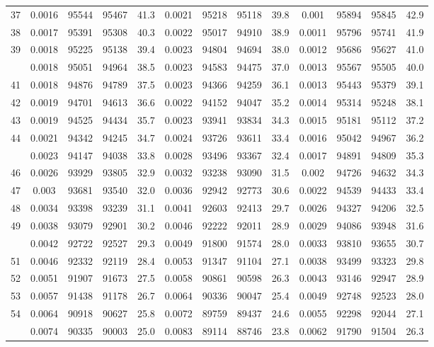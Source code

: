 \documentclass[
  14pt,
]{article}
\begin{document}
\begin{longtable}[t]{lcccccccccccc}
37 & 0.0016 & 95544 & 95467 & 41.3 & 0.0021 & 95218 & 95118 & 39.8 & 0.001 & 95894 & 95845 & 42.9\\
38 & 0.0017 & 95391 & 95308 & 40.3 & 0.0022 & 95017 & 94910 & 38.9 & 0.0011 & 95796 & 95741 & 41.9\\
39 & 0.0018 & 95225 & 95138 & 39.4 & 0.0023 & 94804 & 94694 & 38.0 & 0.0012 & 95686 & 95627 & 41.0\\
\addlinespace
40 & 0.0018 & 95051 & 94964 & 38.5 & 0.0023 & 94583 & 94475 & 37.0 & 0.0013 & 95567 & 95505 & 40.0\\
41 & 0.0018 & 94876 & 94789 & 37.5 & 0.0023 & 94366 & 94259 & 36.1 & 0.0013 & 95443 & 95379 & 39.1\\
42 & 0.0019 & 94701 & 94613 & 36.6 & 0.0022 & 94152 & 94047 & 35.2 & 0.0014 & 95314 & 95248 & 38.1\\
43 & 0.0019 & 94525 & 94434 & 35.7 & 0.0023 & 93941 & 93834 & 34.3 & 0.0015 & 95181 & 95112 & 37.2\\
44 & 0.0021 & 94342 & 94245 & 34.7 & 0.0024 & 93726 & 93611 & 33.4 & 0.0016 & 95042 & 94967 & 36.2\\
\addlinespace
45 & 0.0023 & 94147 & 94038 & 33.8 & 0.0028 & 93496 & 93367 & 32.4 & 0.0017 & 94891 & 94809 & 35.3\\
46 & 0.0026 & 93929 & 93805 & 32.9 & 0.0032 & 93238 & 93090 & 31.5 & 0.002 & 94726 & 94632 & 34.3\\
47 & 0.003 & 93681 & 93540 & 32.0 & 0.0036 & 92942 & 92773 & 30.6 & 0.0022 & 94539 & 94433 & 33.4\\
48 & 0.0034 & 93398 & 93239 & 31.1 & 0.0041 & 92603 & 92413 & 29.7 & 0.0026 & 94327 & 94206 & 32.5\\
49 & 0.0038 & 93079 & 92901 & 30.2 & 0.0046 & 92222 & 92011 & 28.9 & 0.0029 & 94086 & 93948 & 31.6\\
\addlinespace
50 & 0.0042 & 92722 & 92527 & 29.3 & 0.0049 & 91800 & 91574 & 28.0 & 0.0033 & 93810 & 93655 & 30.7\\
51 & 0.0046 & 92332 & 92119 & 28.4 & 0.0053 & 91347 & 91104 & 27.1 & 0.0038 & 93499 & 93323 & 29.8\\
52 & 0.0051 & 91907 & 91673 & 27.5 & 0.0058 & 90861 & 90598 & 26.3 & 0.0043 & 93146 & 92947 & 28.9\\
53 & 0.0057 & 91438 & 91178 & 26.7 & 0.0064 & 90336 & 90047 & 25.4 & 0.0049 & 92748 & 92523 & 28.0\\
54 & 0.0064 & 90918 & 90627 & 25.8 & 0.0072 & 89759 & 89437 & 24.6 & 0.0055 & 92298 & 92044 & 27.1\\
\addlinespace
55 & 0.0074 & 90335 & 90003 & 25.0 & 0.0083 & 89114 & 88746 & 23.8 & 0.0062 & 91790 & 91504 & 26.3\\

\end{longtable}
\end{document}
